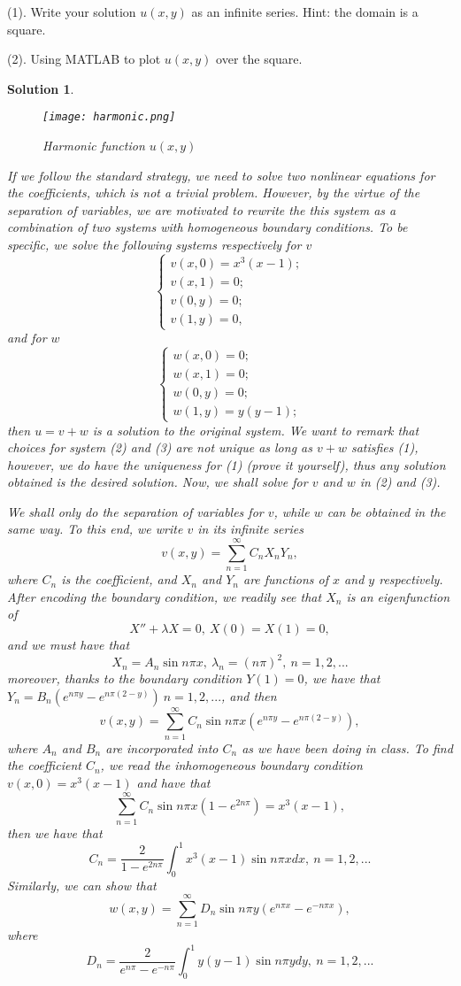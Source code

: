 \documentclass[6pt]{article}
\newtheorem{solution}{Solution}
\numberwithin{equation}{section}
\begin{document}
\begin{enumerate}
(1).  Write your solution $u(x,y)$ as an infinite series.  Hint: the domain is a square.

(2).  Using MATLAB to plot $u(x,y)$ over the square.
\begin{solution}
\begin{figure}
  \centering
  \texttt{[image: harmonic.png]}
  \caption{Harmonic function $u(x,y)$}\label{}
\end{figure}

If we follow the standard strategy, we need to solve two nonlinear equations for the coefficients, which is not a trivial problem.  However, by the virtue of the separation of variables, we are motivated to rewrite the this system as a combination of two systems with homogeneous boundary conditions.  To be specific, we solve the following systems respectively for $v$
\begin{equation}
\left\{
\begin{array}{ll}
v(x,0)=x^3(x-1);\\
v(x,1)=0;\\
v(0,y)=0;\\
v(1,y)=0,
\end{array}
\right.
\end{equation}
and for $w$
\begin{equation}
\left\{
\begin{array}{ll}
w(x,0)=0;\\
w(x,1)=0;\\
w(0,y)=0;\\
w(1,y)=y(y-1);
\end{array}
\right.
\end{equation}
then $u=v+w$ is a solution to the original system.  We want to remark that choices for system (2) and (3) are not unique as long as $v+w$ satisfies (1), however, we do have the uniqueness for (1) (prove it yourself), thus any solution obtained is the desired solution.  Now, we shall solve for $v$ and $w$ in (2) and (3).

We shall only do the separation of variables for $v$, while $w$ can be obtained in the same way.  To this end, we write $v$ in its infinite series
\[v(x,y)=\sum_{n=1}^\infty C_nX_nY_n,\]
where $C_n$ is the coefficient, and $X_n$ and $Y_n$ are functions of $x$ and $y$ respectively.  After encoding the boundary condition, we readily see that $X_n$ is an eigenfunction of
\[X''+\lambda X=0,~X(0)=X(1)=0,\]
and we must have that
\[X_n=A_n\sin n\pi x,~\lambda_n=(n\pi)^2,~n=1,2,...\]
moreover, thanks to the boundary condition $Y(1)=0$, we have that $Y_n=B_n(e^{n\pi y}-e^{n\pi (2-y)})~n=1,2,...$, and then
\[v(x,y)=\sum_{n=1}^\infty C_n \sin n\pi x (e^{n\pi y}-e^{n\pi (2-y)}),\]
where $A_n$ and $B_n$ are incorporated into $C_n$ as we have been doing in class.  To find the coefficient $C_n$, we read the inhomogeneous boundary condition $ v(x,0)=x^3(x-1)$ and have that
\[\sum_{n=1}^\infty C_n \sin n\pi x (1-e^{2n\pi})=x^3(x-1),\]
then we have that
\[C_n=\frac{2}{1-e^{2n\pi}} \int_0^1 x^3(x-1) \sin n\pi xdx,~n=1,2,...\]
Similarly, we can show that
\[w(x,y)=\sum_{n=1}^\infty D_n\sin n\pi y (e^{n\pi x}-e^{-n\pi x}),\]
where \[D_n=\frac{2}{e^{n\pi}-e^{-n\pi}} \int_0^1 y(y-1) \sin n \pi y dy,~n=1,2,... \]


\end{solution}
\end{enumerate}
\end{document}
